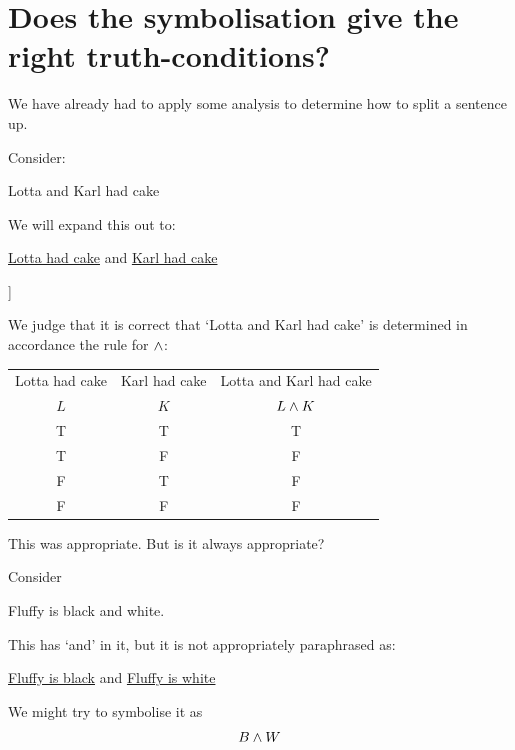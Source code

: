 \section{Does the symbolisation give the right truth-conditions?}\label{sec:SymbTruthConds}

We have already had to apply some analysis to determine how to split a sentence up. 

Consider:
\begin{samplesent}
	\item Lotta and Karl had cake
\end{samplesent}
We will expand this out to:
\begin{samplesent}
	\item[] \underline{Lotta had cake} and \underline{Karl had cake}
\end{samplesent}
\begin{center}
	\begin{forest}
		[Lotta and Karl had cake\\\ldots and \ldots\\$\ldots \eand \ldots$
		[Lotta had cake\\$L$][Karl had cake\\$K$]]
	\end{forest}
\end{center}
We judge that it is correct that `Lotta and Karl had cake' is determined in accordance the rule for $\mathbin{\wedge}$:
\begin{center}
	\begin{tabular}{cc|c}
	Lotta had cake&Karl had cake&Lotta and Karl had cake\\
	$L$&$K$&$L\mathbin{\wedge} K$\Bstrut\\\hline\Tstrut
	T&T&T\\
	T&F&F\\
	F&T&F\\
	F&F&F
\end{tabular}
\end{center}

This was appropriate. But is it always appropriate? 

Consider
\begin{samplesent}
	\item Fluffy is black and white.
\end{samplesent}
This has `and' in it, but it is not appropriately paraphrased as:
\begin{samplesent}
	\item \underline{Fluffy is black} and \underline{Fluffy is white}
\end{samplesent}
We might try to symbolise it as $$B\mathbin{\wedge} W$$

